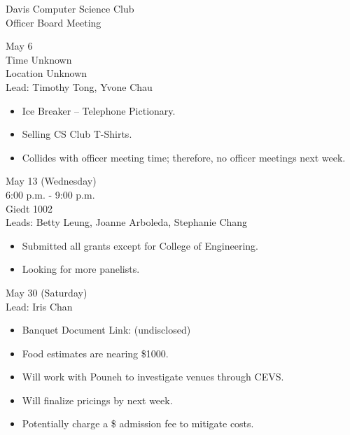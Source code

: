 \documentclass{article}
\begin{document}
\begin{Minutes}{Davis Computer Science Club\\Officer Board Meeting}

May 6\\
Time Unknown\\
Location Unknown\\
Lead: Timothy Tong, Yvone Chau

\begin{itemize}
	\item Ice Breaker -- Telephone Pictionary.
	\item Selling CS Club T-Shirts.
	\item Collides with officer meeting time; therefore, no officer meetings next week.
\end{itemize}


May 13 (Wednesday)\\
6:00 p.m. - 9:00 p.m.\\
Giedt 1002\\
Leads: Betty Leung, Joanne Arboleda, Stephanie Chang

\begin{itemize}
	\item Submitted all grants except for College of Engineering.
	\item Looking for more panelists.
\end{itemize}


May 30 (Saturday)\\
Lead: Iris Chan\\

\begin{itemize}
	\item Banquet Document Link: (undisclosed)
	\item Food estimates are nearing \$1000.
	\item Will work with Pouneh to investigate venues through CEVS.
	\item Will finalize pricings by next week.
	\item Potentially charge a \$ admission fee to mitigate costs.
\end{itemize}



\end{Minutes}
\end{document}
